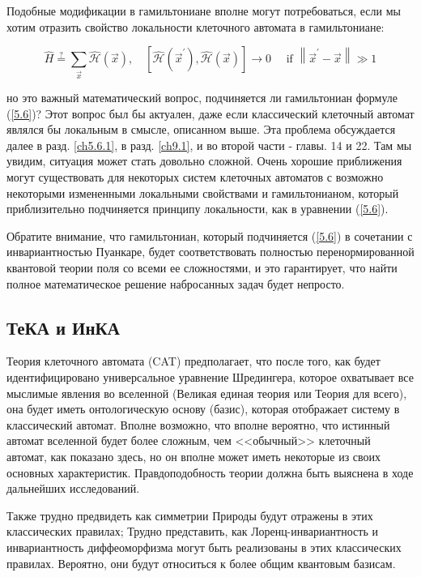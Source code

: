 \documentclass[main.tex]{subfiles}
\begin{document}
Подобные модификации в гамильтониане вполне могут потребоваться, если мы хотим отразить свойство локальности клеточного автомата в гамильтониане:

\begin{equation}\label{5.6}
	\hat H \stackrel{?}{=}\sum_{\vec{x}} \hat{\mathcal{H}}(\vec{x}), \quad\left[\hat{\mathcal{H}}\left(\vec{x}^{\prime}\right), \hat{\mathcal{H}}(\vec{x})\right] \rightarrow 0 \quad \text { if }\left\|\vec{x}^{\prime}-\vec{x}\right\| \gg 1
\end{equation}

но это важный математический вопрос, подчиняется ли гамильтониан формуле (\ref{5.6})? Этот вопрос был бы актуален, даже если классический клеточный автомат являлся бы локальным в смысле, описанном выше. Эта проблема обсуждается далее в разд. \ref{ch5.6.1}, в разд. \ref{ch9.1}, и во второй части - главы. 14 и 22. Там мы увидим, ситуация может стать довольно сложной. Очень хорошие приближения могут существовать для некоторых систем клеточных автоматов с возможно некоторыми измененными локальными свойствами и гамильтонианом, который приблизительно подчиняется принципу локальности, как в уравнении (\ref{5.6}).

Обратите внимание, что гамильтониан, который подчиняется (\ref{5.6}) в сочетании с инвариантностью Пуанкаре, будет соответствовать полностью перенормированной квантовой теории поля со всеми ее сложностями, и это гарантирует, что найти полное математическое решение набросанных задач будет непросто.


\subsection{ТеКА и ИнКА}\label{ch5.2}

Теория клеточного автомата (CAT) предполагает, что после того, как будет идентифицировано универсальное уравнение Шредингера, которое охватывает все мыслимые явления во вселенной (Великая единая теория или Теория для всего), она будет иметь онтологическую основу (базис), которая отображает систему в классический автомат. Вполне возможно, что вполне вероятно, что истинный автомат вселенной будет более сложным, чем <<обычный>> клеточный автомат, как показано здесь, но он вполне может иметь некоторые из своих основных характеристик. Правдоподобность теории должна быть выяснена в ходе дальнейших исследований.

Также трудно предвидеть как симметрии Природы будут отражены в этих классических правилах; Трудно представить, как Лоренц-инвариантность и инвариантность диффеоморфизма могут быть реализованы в этих классических правилах. Вероятно, они будут относиться к более общим квантовым базисам.
\end{document}

